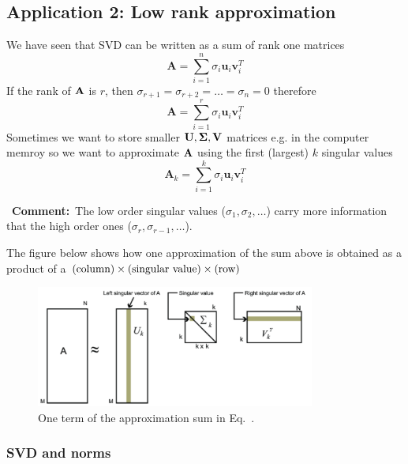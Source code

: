 \documentclass[a4paper]{article}
\numberwithin{equation}{section} %
\newcommand{\B}[1]{\textbf{\textup{#1}}} %
\renewcommand{\eqref}{Eq.~\originaleqref}
\renewcommand*{\eqref}[1]{Eq.~\originaleqref{#1}}
\newcommand{\mycomment}[1]{\begin{leftrightbox}\Pointinghand~\textbf{Comment:}~#1 \end{leftrightbox}}
\begin{document}
\subsection{Application 2: Low rank approximation}

We have seen that SVD can be written as a sum of rank one matrices
\[
\mathbf{A}=\sum\limits_{i=1}^{n}{{{\sigma }_{i}}{{\mathbf{u}}_{i}}\mathbf{v}_{i}^{T}}
\]
If the rank of $\B{A}$ is $r$, then $\sigma_{r+1}=\sigma_{r+2}=\ldots=\sigma_{n}=0$ therefore
\[
\mathbf{A}=\sum\limits_{i=1}^{r}{{{\sigma }_{i}}{{\mathbf{u}}_{i}}\mathbf{v}_{i}^{T}}
\]
Sometimes we want to store smaller $\B{U},\boldsymbol{\Sigma},\B{V}$ matrices e.g. in the computer memroy so we want to approximate $\B{A}$ using the first (largest) $k$ singular values
\begin{equation}
{{\mathbf{A}}_{k}}=\sum\limits_{i=1}^{k}{{{\sigma }_{i}}{{\mathbf{u}}_{i}}\mathbf{v}_{i}^{T}}
\label{eq:svd_approx}
\end{equation}
\mycomment{The low order singular values ($\sigma_1,\sigma_2,\ldots$) carry more information that the high order ones ($\sigma_r, \sigma_{r-1},\ldots$).
} %
The figure below shows how one approximation of the sum above is obtained as a product of a $\textup{(column)} \times \textup{(singular value)} \times \textup{(row)}$
\begin{figure}[H]
	\centering %
	\includegraphics[height=4cm]{svd_low_rank.png}
    \caption{One term of the approximation sum in \eqref{eq:svd_approx}.}
    \label{fig:svd_approx_term}
\end{figure}



\subsubsection{SVD and norms}
\end{document}

